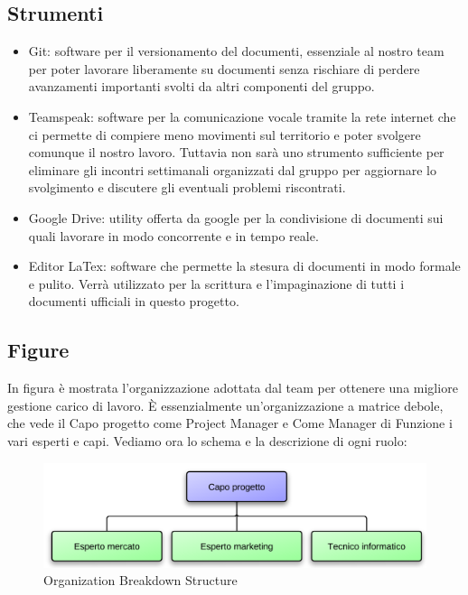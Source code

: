 \subsection{Strumenti}
\begin{itemize}
\item Git: software per il versionamento del documenti, essenziale al nostro team per poter lavorare liberamente su documenti senza rischiare di perdere avanzamenti importanti svolti da altri componenti del gruppo.
\item Teamspeak: software per la comunicazione vocale tramite la rete internet che ci permette di compiere meno movimenti sul territorio e poter svolgere comunque il nostro lavoro. Tuttavia non sarà uno strumento sufficiente per eliminare gli incontri settimanali organizzati dal gruppo per aggiornare lo svolgimento e discutere gli eventuali problemi riscontrati.
\item Google Drive: utility offerta da google per la condivisione di documenti sui quali lavorare in modo concorrente e in tempo reale.
\item Editor LaTex: software che permette la stesura di documenti in modo formale e pulito. Verrà utilizzato per la scrittura e l'impaginazione di tutti i documenti ufficiali in questo progetto.
\end{itemize}

\subsection{Figure}
In figura  è mostrata l'organizzazione adottata dal team per ottenere una migliore gestione carico di lavoro. È essenzialmente un'organizzazione a matrice debole, che vede il Capo progetto come Project Manager e Come Manager di Funzione i vari esperti e capi. Vediamo ora lo schema e la descrizione di ogni ruolo:

\vspace*{0.5cm}

\begin{figure}[H]
\centering
\includegraphics[scale=1]{images/cap3/obs.png}
\caption{Organization Breakdown Structure}
\end{figure}

